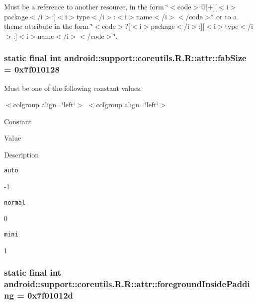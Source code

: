 Must be a reference to another resource, in the form \char`\"{}$<$code$>$@\mbox{[}+\mbox{]}\mbox{[}$<$i$>$package$<$/i$>$:\mbox{]}$<$i$>$type$<$/i$>$:$<$i$>$name$<$/i$>$$<$/code$>$\char`\"{} or to a theme attribute in the form \char`\"{}$<$code$>$?\mbox{[}$<$i$>$package$<$/i$>$:\mbox{]}\mbox{[}$<$i$>$type$<$/i$>$:\mbox{]}$<$i$>$name$<$/i$>$$<$/code$>$\char`\"{}. \hypertarget{classandroid_1_1support_1_1coreutils_1_1_r_1_1attr_a4b2a494261ee51c15294377653073ff}{
\subsubsection[{fabSize}]{\setlength{\rightskip}{0pt plus 5cm}static final int android::support::coreutils.R.R::attr::fabSize = 0x7f010128}}
\label{classandroid_1_1support_1_1coreutils_1_1_r_1_1attr_a4b2a494261ee51c15294377653073ff}


Must be one of the following constant values. \begin{TabularC}{0}
\hline
\end{TabularC}
$<$colgroup align=\char`\"{}left\char`\"{}$>$ $<$colgroup align=\char`\"{}left\char`\"{}$>$ 

Constant

Value

Description 

{\tt auto}

-1

{\tt normal}

0

{\tt mini}

1\hypertarget{classandroid_1_1support_1_1coreutils_1_1_r_1_1attr_5d9efed6832c1ef560faae0f018cb51e}{
\subsubsection[{foregroundInsidePadding}]{\setlength{\rightskip}{0pt plus 5cm}static final int android::support::coreutils.R.R::attr::foregroundInsidePadding = 0x7f01012d}}
\label{classandroid_1_1support_1_1coreutils_1_1_r_1_1attr_5d9efed6832c1ef560faae0f018cb51e}


